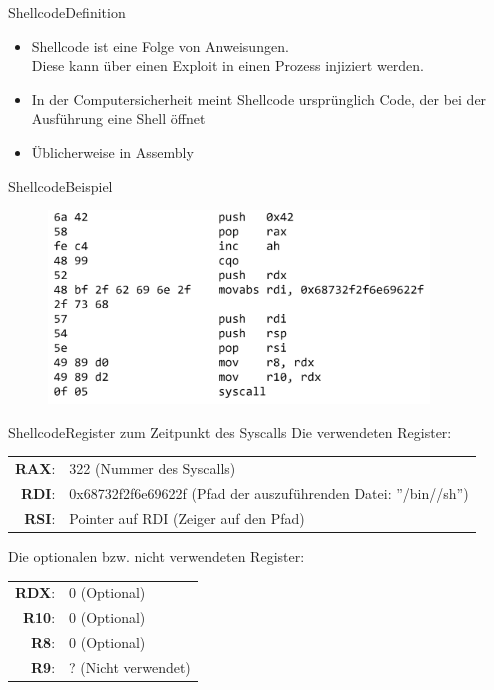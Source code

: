 \begin{frame}{Shellcode}{Definition}
    \begin{itemize}
        \item Shellcode ist eine Folge von Anweisungen. \\
        Diese kann über einen Exploit in einen Prozess injiziert werden.
        \item In der Computersicherheit meint Shellcode ursprünglich Code,
        der bei der Ausführung eine Shell öffnet
        \item Üblicherweise in Assembly
    \end{itemize}
\end{frame}


\begin{frame}{Shellcode}{Beispiel}
    \begin{figure}[h]
        \centering
        \includegraphics[width=0.9\textwidth,height=0.75\textheight,keepaspectratio]{images/shellstorm.png}
    \end{figure}
\end{frame}

\begin{frame}{Shellcode}{Register zum Zeitpunkt des Syscalls}
    Die verwendeten Register:
    
    \begin{tabular}{rl}
        {\textbf{RAX}:}& {322 (Nummer des Syscalls)}\\
        {\textbf{RDI}:}& {0x68732f2f6e69622f (Pfad der auszuführenden Datei: ''/bin//sh'')}\\
        {\textbf{RSI}:}& {Pointer auf RDI (Zeiger auf den Pfad)}
    \end{tabular}
    \vspace{1em}
    
    Die optionalen bzw. nicht verwendeten Register:
    
    \begin{tabular}{rl}
        {\textbf{RDX}:}& {0 (Optional)}\\
        {\textbf{R10}:}& {0 (Optional)}\\
        {\textbf{R8}:}& {0 (Optional)}\\
        {\textbf{R9}:}& {? (Nicht verwendet)}
    \end{tabular}

\end{frame}